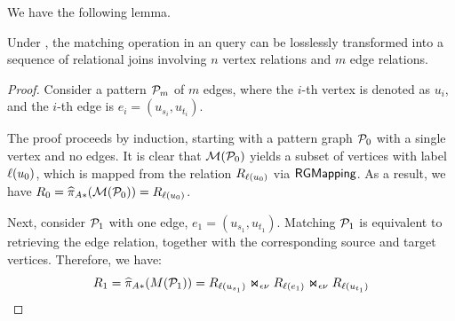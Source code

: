 We have the following lemma.%


\begin{lemma}
    \label{lem:spjm-to-spj}
    Under \rgmapping, the matching operation in an \spjm query can be losslessly transformed into a sequence of relational joins involving $n$ vertex relations and $m$ edge relations.
\end{lemma}
\begin{proof}
    Consider a pattern $\mathcal{P}_m$ of $m$ edges, where the $i$-th vertex is denoted as $u_i$, and the $i$-th edge is $e_i = (u_{s_i}, u_{t_i})$. %

The proof proceeds by induction, starting with a pattern graph $\mathcal{P}_0$ with a single vertex and no edges. It is clear that $\mathcal{M}(\mathcal{P}_0)$ yields a subset of vertices with label $\mathcal{\ell}(u_0)$, which is mapped from the relation ${R_{\mathcal{\ell}(u_0)}}$ via ${\mathsf{RGMapping}}$. As a result, we have $R_0 = \widehat{\pi}_{A*}(\mathcal{M}(\mathcal{P}_0)) = {R_{\mathcal{\ell}(u_0)}}$.

Next, consider $\mathcal{P}_1$ with one edge, $e_1 = (u_{s_1}, u_{t_1})$. Matching $\mathcal{P}_1$ is equivalent to retrieving the edge relation, together with the corresponding source and target vertices. Therefore, we have:
\[ R_1 = \widehat{\pi}_{A*}(M(\mathcal{P}_1)) = {R_{\mathcal{\ell}(u_{s_1})}} \Join_{\epsilon\nu} {R_{\mathcal{\ell}(e_1)}} \Join_{\epsilon\nu} {R_{\mathcal{\ell}(u_{t_1})}} \]


\end{proof}
